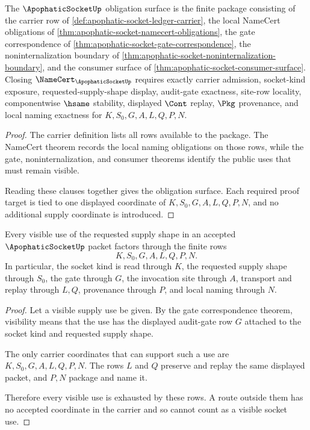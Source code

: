 \begin{theorem}
\label{thm:apophatic-socket-obligation-closure-package}
The $\ApophaticSocketUp$ obligation surface is the finite package consisting of the carrier row of \autoref{def:apophatic-socket-ledger-carrier}, the local NameCert obligations of \autoref{thm:apophatic-socket-namecert-obligations}, the gate correspondence of \autoref{thm:apophatic-socket-gate-correspondence}, the noninternalization boundary of \autoref{thm:apophatic-socket-noninternalization-boundary}, and the consumer surface of \autoref{thm:apophatic-socket-consumer-surface}. Closing $\NameCert_{\ApophaticSocketUp}$ requires exactly carrier admission, socket-kind exposure, requested-supply-shape display, audit-gate exactness, site-row locality, componentwise $\hsame$ stability, displayed $\Cont$ replay, $\Pkg$ provenance, and local naming exactness for $K,S_0,G,A,L,Q,P,N$.
\end{theorem}
\begin{proof}
The carrier definition lists all rows available to the package. The NameCert theorem records the local naming obligations on those rows, while the gate, noninternalization, and consumer theorems identify the public uses that must remain visible.

Reading these clauses together gives the obligation surface. Each required proof target is tied to one displayed coordinate of $K,S_0,G,A,L,Q,P,N$, and no additional supply coordinate is introduced.
\end{proof}

\begin{theorem}
\label{thm:apophatic-socket-gated-supply-route-exhaustion}
Every visible use of the requested supply shape in an accepted $\ApophaticSocketUp$ packet factors through the finite rows
$$
K,S_0,G,A,L,Q,P,N.
$$
In particular, the socket kind is read through $K$, the requested supply shape through $S_0$, the gate through $G$, the invocation site through $A$, transport and replay through $L,Q$, provenance through $P$, and local naming through $N$.
\end{theorem}
\begin{proof}
Let a visible supply use be given. By the gate correspondence theorem, visibility means that the use has the displayed audit-gate row $G$ attached to the socket kind and requested supply shape.

The only carrier coordinates that can support such a use are $K,S_0,G,A,L,Q,P,N$. The rows $L$ and $Q$ preserve and replay the same displayed packet, and $P,N$ package and name it.

Therefore every visible use is exhausted by these rows. A route outside them has no accepted coordinate in the carrier and so cannot count as a visible socket use.
\end{proof}

